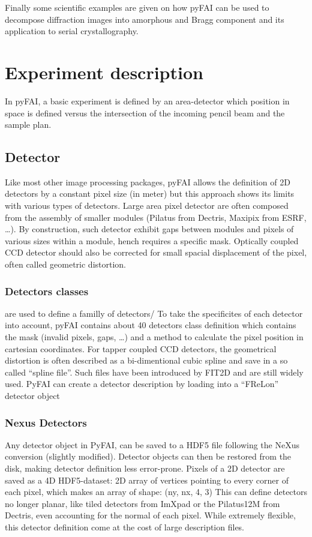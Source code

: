\documentclass[preprint]{iucr}
\begin{document}
Finally some scientific examples are given on how pyFAI can be used to decompose 
diffraction images into amorphous and Bragg component and its application
to serial crystallography.
 
\section{Experiment description}
In pyFAI, a basic experiment is defined by an area-detector which position in
space is defined versus the intersection of the incoming pencil beam and the
sample plan.

\subsection{Detector}
Like most other image processing packages, pyFAI allows the definition of 2D
detectors by a constant pixel size (in meter) but this approach shows its limits
with various types of detectors.
Large area pixel detector are often composed from the assembly of smaller
modules (Pilatus from Dectris, Maxipix from ESRF, \ldots). 
By construction, such detector exhibit gaps between modules and pixels of
various sizes within a module, hench requires a specific mask.
Optically coupled CCD detector should also be corrected
for small spacial displacement of the pixel, often called geometric distortion.

\subsubsection{Detectors classes} are used to define a familly of detectors/ 
To take the specificites of each detector into account, pyFAI contains about
40 detectors class definition which contains the mask (invalid pixels, gaps,
\ldots) and a method to calculate the pixel position in cartesian coordinates.
For tapper coupled CCD detectors, the geometrical distortion is often
described as a bi-dimentional cubic spline and save in a so called ``spline
file''. 
Such files have been introduced by FIT2D \cite{fit2d} and are still widely
used. PyFAI can create a detector description by loading into a ``FReLon''
detector object

\subsubsection{Nexus Detectors}
Any detector object in PyFAI, can be saved to a HDF5 file following the NeXus
conversion (slightly modified).
Detector objects can then be restored from the disk, making detector definition
less error-prone.
Pixels of a 2D detector are saved as a 4D HDF5-dataset: 2D array of vertices
pointing to every corner of each pixel, which makes an array of shape: (ny, nx, 4, 3)
This can define detectors no longer planar, like tiled detectors from
ImXpad or the Pilatus12M from Dectris, even accounting for the normal of each
pixel. 
While extremely flexible, this detector definition come at the cost of
large description files.
\end{document}
